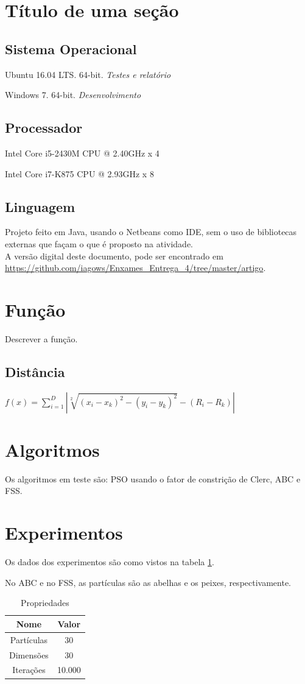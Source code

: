\documentclass[journal]{IEEEtran}
\begin{document}
\section{Título de uma seção}
\subsection{Sistema Operacional}
Ubuntu 16.04 LTS. 64-bit.\textit{ Testes e relatório }\par
Windows 7. 64-bit.\textit{ Desenvolvimento}
\subsection{Processador}
Intel Core i5-2430M CPU @ 2.40GHz x 4\par
Intel Core i7-K875 CPU @ 2.93GHz x 8
\subsection{Linguagem}
Projeto feito em Java, usando o Netbeans como IDE, sem o uso de bibliotecas externas que façam o que é proposto na atividade.\\A versão digital deste documento, pode ser encontrado em \url{https://github.com/iagows/Enxames_Entrega_4/tree/master/artigo}.%

\section{Função}
Descrever a função.
\subsection{Distância}
$f(x)=\sum\limits_{i=1}^{D}|\sqrt[2]{(x_i - x_k)^2 - (y_i - y_k)^2} - (R_i - R_k)|$

\section{Algoritmos}
Os algoritmos em teste são: PSO usando o fator de constrição de Clerc, ABC e FSS.

\section{Experimentos}
Os dados dos experimentos são como vistos na tabela \ref{table:prop}.\par
No ABC e no FSS, as partículas são as abelhas e os peixes, respectivamente.
\begin{table}
\renewcommand{\arraystretch}{1.3}
\caption{Propriedades}
\label{table:prop}
\centering
\begin{tabular}{c|c}
    \hline
    Nome  &  Valor\\
    \hline
    \hline

    Partículas & 30\\
    \hline
    Dimensões & 30\\
    \hline
    Iterações & 10.000\\
    \hline
\end{tabular}
\end{table}
\end{document}
